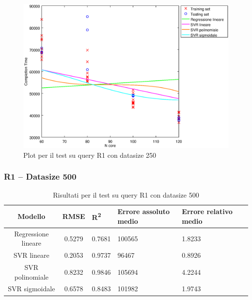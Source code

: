 \documentclass[a4paper,11pt]{article}
\begin{document}
\begin {figure}[hbtp]
\centering
\includegraphics[width=\textwidth]{output/R1_250/plot_R1_250.eps}
\caption {Plot per il test su query R1 con datasize 250}
\end {figure}

\newpage

\newpage
\subsubsection{R1 -- Datasize 500}

\begin{table}[bhpt]
	\centering
	\begin{adjustbox}{center}
		\begin{tabular}{c | c M{1cm} M{2.5cm} M{2.5cm} M{1.8cm}}
			Modello & RMSE & R\textsuperscript{2} & Errore assoluto medio & Errore relativo medio \tabularnewline
			\hline
			Regressione lineare & 0.5279 & 0.7681 & 100565 & 1.8233 \\
			SVR lineare & 0.2053 & 0.9737 &  96467 & 0.8926 \\
			SVR polinomiale & 0.8232 & 0.9846 & 105694 & 4.2244 \\
			SVR sigmoidale & 0.6578 & 0.8483 & 101982 & 1.9743 \\
		\end{tabular}
	\end{adjustbox}
	\\
	\caption{Risultati per il test su query R1 con datasize 500}
	\label{table_R1_500}
\end{table}
\end{document}

